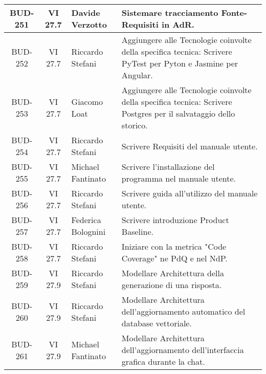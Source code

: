 \begin{table}[htbp]
\begin{tabular}{|c|c|p{}|p{}|}
    \hline
    BUD-251 & VI 27.7 & Davide Verzotto &  Sistemare tracciamento Fonte-Requisiti in AdR.\\
    \hline
    BUD-252 & VI 27.7 & Riccardo Stefani & Aggiungere alle Tecnologie coinvolte della specifica tecnica: Scrivere PyTest per Pyton e Jasmine per Angular. \\
    \hline
    BUD-253 & VI 27.7 & Giacomo Loat & Aggiungere alle Tecnologie coinvolte della specifica tecnica: Scrivere Postgres per il salvataggio dello storico. \\
    \hline
    BUD-254 & VI 27.7 & Riccardo Stefani & Scrivere Requisiti del manuale utente. \\
    \hline
    BUD-255 & VI 27.7 & Michael Fantinato & Scrivere l'installazione del programma nel manuale utente. \\
    \hline
    BUD-256 & VI 27.7 & Riccardo Stefani & Scrivere guida all'utilizzo del manuale utente.\\
    \hline
    BUD-257 & VI 27.7 & Federica Bolognini & Scrivere introduzione Product Baseline. \\
    \hline
    BUD-258 & VI 27.7 & Riccardo Stefani & Iniziare con la metrica "Code Coverage" ne PdQ e nel NdP. \\
    \hline
    BUD-259 & VI 27.9 & Riccardo Stefani & Modellare Architettura della generazione di una risposta. \\
    \hline
    BUD-260 & VI 27.9 & Riccardo Stefani & Modellare Architettura dell'aggiornamento automatico del database vettoriale. \\
    \hline
    BUD-261 & VI 27.9 & Michael Fantinato & Modellare Architettura dell'aggiornamento dell'interfaccia grafica durante la chat. \\
    \hline
\end{tabular}
\end{table}

